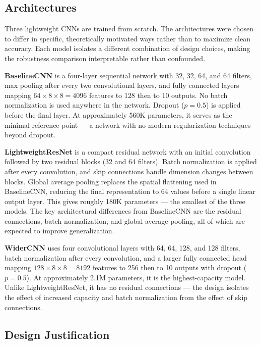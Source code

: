 \documentclass[conference]{IEEEtran}
\begin{document}
\subsection{Architectures}

Three lightweight CNNs are trained from scratch. The architectures were chosen to differ in specific, theoretically motivated ways rather than to maximize clean accuracy. Each model isolates a different combination of design choices, making the robustness comparison interpretable rather than confounded.

\textbf{BaselineCNN} is a four-layer sequential network with 32, 32, 64, and 64 filters, max pooling after every two convolutional layers, and fully connected layers mapping $64{\times}8{\times}8 = 4096$ features to 128 then to 10 outputs. No batch normalization is used anywhere in the network. Dropout ($p = 0.5$) is applied before the final layer. At approximately 560K parameters, it serves as the minimal reference point --- a network with no modern regularization techniques beyond dropout.

\textbf{LightweightResNet} is a compact residual network with an initial convolution followed by two residual blocks (32 and 64 filters). Batch normalization is applied after every convolution, and skip connections handle dimension changes between blocks. Global average pooling replaces the spatial flattening used in BaselineCNN, reducing the final representation to 64 values before a single linear output layer. This gives roughly 180K parameters --- the smallest of the three models. The key architectural differences from BaselineCNN are the residual connections, batch normalization, and global average pooling, all of which are expected to improve generalization.

\textbf{WiderCNN} uses four convolutional layers with 64, 64, 128, and 128 filters, batch normalization after every convolution, and a larger fully connected head mapping $128{\times}8{\times}8 = 8192$ features to 256 then to 10 outputs with dropout ($p = 0.5$). At approximately 2.1M parameters, it is the highest-capacity model. Unlike LightweightResNet, it has no residual connections --- the design isolates the effect of increased capacity and batch normalization from the effect of skip connections.

\subsection{Design Justification}
\end{document}

